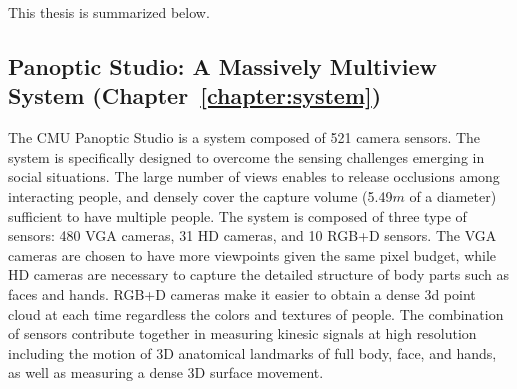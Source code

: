 This thesis is summarized below. 
%
%
%
%
%

\subsection{Panoptic Studio: A Massively Multiview System (Chapter~\ref{chapter:system})}
The CMU Panoptic Studio is a system composed of 521 camera sensors. The system is specifically designed to overcome the sensing challenges emerging in social situations. The large number of views enables to release occlusions among interacting people, and densely cover the capture volume (5.49$m$ of a diameter) sufficient to have multiple people. The system is composed of three type of sensors: 480 VGA cameras, 31 HD cameras, and 10 RGB+D sensors. The VGA cameras are chosen to have more viewpoints given the same pixel budget, while HD cameras are necessary to capture the detailed structure of body parts such as faces and hands. RGB+D cameras make it easier to obtain a dense 3d point cloud at each time regardless the colors and textures of people. The combination of sensors contribute together in measuring kinesic signals at high resolution including the motion of 3D anatomical landmarks of full body, face, and hands, as well as measuring a dense 3D surface movement. 

